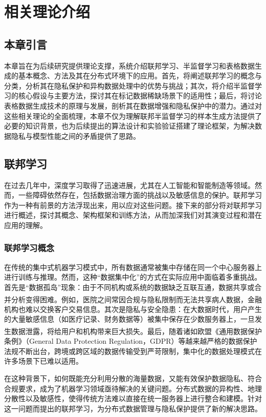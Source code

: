 \chapter{相关理论介绍}
\thispagestyle{others}
\pagestyle{others}
\xiaosi

\section{本章引言}
本章旨在为后续研究提供理论支撑，系统介绍联邦学习、半监督学习和表格数据生成的基本概念、方法及其在分布式环境下的应用。首先，将阐述联邦学习的概念与分类，分析其在隐私保护和异构数据处理中的优势与挑战；其次，将介绍半监督学习的核心假设与主要方法，探讨其在标记数据稀缺场景下的适用性；最后，将讨论表格数据生成技术的原理与发展，剖析其在数据增强和隐私保护中的潜力。通过对这些相关理论的全面梳理，本章不仅为理解联邦半监督学习的样本生成方法提供了必要的知识背景，也为后续提出的算法设计和实验验证搭建了理论框架，为解决数据隐私与模型性能之间的矛盾提供了思路。

\section{联邦学习}
在过去几年中，深度学习取得了迅速进展，尤其在人工智能和智能制造等领域。然而，一些障碍依然存在，包括数据治理方面的挑战以及敏感信息的保护。联邦学习作为一种有前景的方法浮现出来，用以应对这些问题。接下来的部分将对联邦学习进行概述，探讨其概念、架构框架和训练方法，从而加深我们对其演变过程和潜在应用的理解。

\subsection{联邦学习概念}
在传统的集中式机器学习模式中，所有数据通常被集中存储在同一个中心服务器上进行训练与推理。然而，这种“数据集中化”的方式在实际应用中面临着多重挑战。首先是“数据孤岛”现象：由于不同机构或系统的数据缺乏互联互通，数据共享或合并分析变得困难\textsuperscript{\cite{yang2019federated}}。例如，医院之间常因合规与隐私限制而无法共享病人数据，金融机构也难以交换客户交易信息。其次是隐私与安全隐患：在大数据时代，用户产生的大量敏感信息（如医疗记录、财务数据等）被集中保存在少数服务器上，一旦发生数据泄露，将给用户和机构带来巨大损失\textsuperscript{\cite{mcmahan2017communication}}。最后，随着诸如欧盟《通用数据保护条例》（General Data Protection Regulation，GDPR）等越来越严格的数据保护法规不断出台，跨境或跨区域的数据传输受到严苛限制，集中化的数据处理模式在许多场景下已难以适用。

在这种背景下，如何既能充分利用分散的海量数据，又能有效保护数据隐私、符合合规要求，成为了机器学习领域亟待解决的关键问题。分布式数据的异构性、地理分散性以及敏感性，使得传统方法难以直接在统一服务器上进行整合和建模。针对这一问题而提出的联邦学习，为分布式数据管理与隐私保护提供了新的解决思路。

